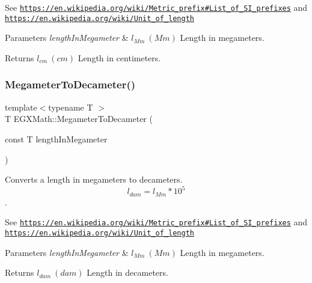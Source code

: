 See \href{https://en.wikipedia.org/wiki/Metric_prefix#List_of_SI_prefixes}{\tt https\+://en.\+wikipedia.\+org/wiki/\+Metric\+\_\+prefix\#\+List\+\_\+of\+\_\+\+S\+I\+\_\+prefixes} and \href{https://en.wikipedia.org/wiki/Unit_of_length}{\tt https\+://en.\+wikipedia.\+org/wiki/\+Unit\+\_\+of\+\_\+length} 
\begin{DoxyParams}{Parameters}
{\em length\+In\+Megameter} & $ l_{Mm}\ (Mm)$ Length in megameters. \\
\hline
\end{DoxyParams}
\begin{DoxyReturn}{Returns}
$ l_{cm}\ (cm)$ Length in centimeters. 
\end{DoxyReturn}
\mbox{\label{group___e_g_x_math-_conversions-_length_conversions-_s_i-_megameter-_s_i_ga7e758185a466f8ac5f956650312b9019}} 
\subsubsection{\texorpdfstring{Megameter\+To\+Decameter()}{MegameterToDecameter()}}
{\footnotesize\ttfamily template$<$typename T $>$ \\
T E\+G\+X\+Math\+::\+Megameter\+To\+Decameter (\begin{DoxyParamCaption}\item[{const T}]{length\+In\+Megameter }\end{DoxyParamCaption})}



Converts a length in megameters to decameters. \[ l_{dam}=l_{Mm} * 10^{5} \]. 

See \href{https://en.wikipedia.org/wiki/Metric_prefix#List_of_SI_prefixes}{\tt https\+://en.\+wikipedia.\+org/wiki/\+Metric\+\_\+prefix\#\+List\+\_\+of\+\_\+\+S\+I\+\_\+prefixes} and \href{https://en.wikipedia.org/wiki/Unit_of_length}{\tt https\+://en.\+wikipedia.\+org/wiki/\+Unit\+\_\+of\+\_\+length} 
\begin{DoxyParams}{Parameters}
{\em length\+In\+Megameter} & $ l_{Mm}\ (Mm)$ Length in megameters. \\
\hline
\end{DoxyParams}
\begin{DoxyReturn}{Returns}
$ l_{dam}\ (dam)$ Length in decameters. 
\end{DoxyReturn}
\mbox{\label{group___e_g_x_math-_conversions-_length_conversions-_s_i-_megameter-_s_i_gaf63f319e0852676dab85aaebc462e8a3}} 
